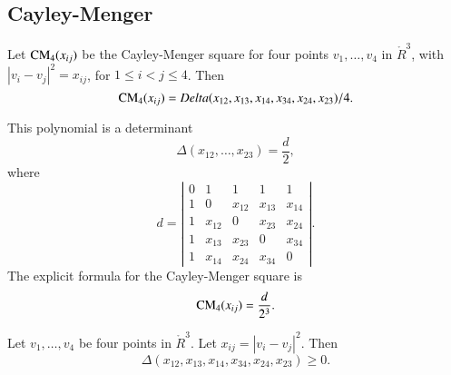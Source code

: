 \begin{tarskidata}
\begin{tarski}
\section{Cayley-Menger}

\begin{lemma}
	Let ${\operatorname{CM}}_4(x_{ij})$ be the Cayley-Menger square for
four points $v_1,\ldots,v_4$ in $\ring{R}^3$, with $|v_i-v_j|^2 = x_{ij}$,
for $1\le i < j \le 4$.  Then
	$${\operatorname{CM}}_4(x_{ij}) = Delta(x_{12},x_{13},x_{14},x_{34},x_{24},x_{23})/4.$$
\end{lemma}

\begin{proved}
This polynomial is a determinant  $$\Delta(x_{12},\ldots,x_{23}) = \frac{d}{2},$$
where $$
     d=\left|\begin{matrix}
     0 & 1 & 1 & 1 & 1\\
     1 & 0 & x_{12} & x_{13} & x_{14} \\
     1 & x_{12} & 0 & x_{23} & x_{24} \\
     1 & x_{13} & x_{23} & 0 & x_{34} \\
     1 & x_{14} & x_{24} & x_{34} & 0
  \end{matrix}\right|.
  $$
The explicit formula for the Cayley-Menger
square is
	$$
	{\operatorname{CM}}_4(x_{ij}) = \frac{d}{2^3}.
	$$
\swallowed\end{proved}
\end{tarski}




\begin{tarski}

\begin{lemma}
Let $v_1,\ldots,v_4$ be four points
in $\ring{R}^3$.  Let $x_{ij} = |v_i-v_j|^2$.  Then
	$$\Delta(x_{12},x_{13},x_{14},x_{34},x_{24},x_{23})\ge0.$$
\end{lemma}

\begin{proved}
\swallowed\end{proved}
\end{tarski}



\begin{tarski}


\end{tarski}
\end{tarskidata}

